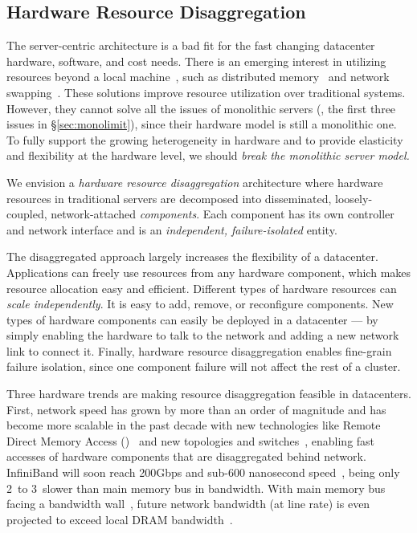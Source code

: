 \documentclass[10pt,times,twocolumn]{z2-article}
\begin{document}
\subsection{Hardware Resource Disaggregation}
The server-centric architecture is a bad fit for the fast changing datacenter hardware, software, and cost needs.
There is an emerging interest in utilizing resources beyond a local machine~\cite{Gao16-OSDI},
such as distributed memory~\cite{Dragojevic14-FaRM,Nelson15-ATC,Aguilera17-SOCC,Novakovic16-SOCC} and network swapping~\cite{GU17-NSDI}. 
These solutions improve resource utilization over traditional systems.
However, they cannot solve all the issues of monolithic servers (\eg, the first three issues in \S\ref{sec:monolimit}), 
since their hardware model is still a monolithic one.
To fully support the growing heterogeneity in hardware and to provide elasticity and flexibility at the hardware level, 
we should {\em break the monolithic server model.}%

We envision a {\em hardware resource disaggregation} architecture 
where hardware resources in traditional servers are decomposed into disseminated, loosely-coupled, network-attached {\em components}.
Each component has its own controller and network interface
and is an {\em independent, failure-isolated} entity.

The disaggregated approach largely increases the flexibility of a datacenter.
Applications can freely use resources from any hardware component,
which makes resource allocation easy and efficient.
Different types of hardware resources can {\em scale independently}.
It is easy to add, remove, or reconfigure components.
New types of hardware components can easily be deployed in a datacenter ---
by simply enabling the hardware to talk to the network and adding a new network link to connect it.
Finally, hardware resource disaggregation enables fine-grain failure isolation, %
since one component failure will not affect the rest of a cluster.

Three hardware trends are making resource disaggregation feasible in datacenters.
First, network speed has grown by more than an order of magnitude and has become more scalable in the past decade %
with new technologies like Remote Direct Memory Access ({\em \rdma})~\cite{ibverbs} 
and new topologies and switches~\cite{FireBox-FASTKeynote,costa15-r2c2,Costa-WRSC14},
enabling fast accesses of hardware components that are disaggregated behind network.
InfiniBand will soon reach 200Gbps and sub-600 nanosecond speed~\cite{Mellanox-ConnectX6-IB},
being only 2\x\ to 3\x\ slower than main memory bus in bandwidth.
With main memory bus facing a bandwidth wall~\cite{BW-Wall-ISCA09},
future network bandwidth (at line rate) is even projected to exceed local DRAM bandwidth~\cite{CacheCloud-hotcloud18}.
\end{document}
